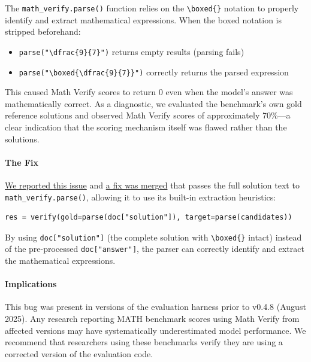 The \texttt{math\_verify.parse()} function relies on the \verb|\boxed{}| notation to properly identify and extract mathematical expressions.
When the boxed notation is stripped beforehand:
\begin{itemize}
    \item \texttt{parse("\textbackslash dfrac\{9\}\{7\}")} returns empty results (parsing fails)
    \item \texttt{parse("\textbackslash boxed\{\textbackslash dfrac\{9\}\{7\}\}")} correctly returns the parsed expression
\end{itemize}

This caused Math Verify scores to return 0 even when the model's answer was mathematically correct.
As a diagnostic, we evaluated the benchmark's own gold reference solutions and observed Math Verify scores of approximately 70\%---a clear indication that the scoring mechanism itself was flawed rather than the solutions.

\paragraph{The Fix}
\href{https://github.com/EleutherAI/lm-evaluation-harness/issues/3210}{We reported this issue} and \href{https://github.com/EleutherAI/lm-evaluation-harness/pull/3259}{a fix was merged} that passes the full solution text to \texttt{math\_verify.parse()}, allowing it to use its built-in extraction heuristics:
\begin{verbatim}
res = verify(gold=parse(doc["solution"]), target=parse(candidates))
\end{verbatim}

By using \texttt{doc["solution"]} (the complete solution with \verb|\boxed{}| intact) instead of the pre-processed \texttt{doc["answer"]}, the parser can correctly identify and extract the mathematical expressions.

\paragraph{Implications}
This bug was present in versions of the evaluation harness prior to v0.4.8 (August 2025).
Any research reporting MATH benchmark scores using Math Verify from affected versions may have systematically underestimated model performance.
We recommend that researchers using these benchmarks verify they are using a corrected version of the evaluation code.

\clearpage

